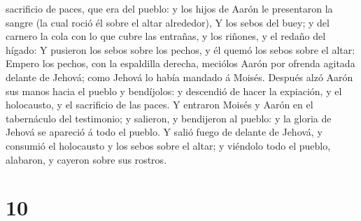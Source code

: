 sacrificio de paces, que era del pueblo: y los hijos de Aarón le
presentaron la sangre (la cual roció él sobre el altar alrededor),
 Y los sebos del buey; y del carnero la cola con lo que
cubre las entrañas, y los riñones, y el redaño del hígado:
 Y pusieron los sebos sobre los pechos, y él quemó los
sebos sobre el altar:  Empero los pechos, con la
espaldilla derecha, meciólos Aarón por ofrenda agitada delante de
Jehová; como Jehová lo había mandado á Moisés.  Después
alzó Aarón sus manos hacia el pueblo y bendíjolos: y descendió de hacer
la expiación, y el holocausto, y el sacrificio de las paces.
 Y entraron Moisés y Aarón en el tabernáculo del
testimonio; y salieron, y bendijeron al pueblo: y la gloria de Jehová se
apareció á todo el pueblo.  Y salió fuego de delante de
Jehová, y consumió el holocausto y los sebos sobre el altar; y viéndolo
todo el pueblo, alabaron, y cayeron sobre sus rostros.

\hypertarget{section-9}{%
\section{10}\label{section-9}}

